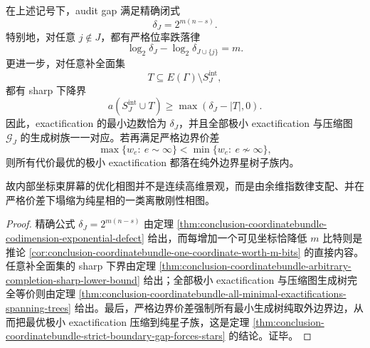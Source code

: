 \begin{theorem}[余维指数律与纯星极小相]\label{thm:conclusion-integrable-screen-codimension-exponential-purestar}
在上述记号下，audit gap 满足精确闭式
\[
\delta_J=2^{m(n-s)}.
\]
特别地，对任意 \(j\notin J\)，都有严格位率跌落律
\[
\log_2\delta_J-\log_2\delta_{J\cup\{j\}}=m.
\]
更进一步，对任意补全面集
\[
T\subseteq E(\Gamma)\setminus S_J^{\mathrm{int}},
\]
都有 sharp 下降界
\[
a(S_J^{\mathrm{int}}\cup T)\ge \max(\delta_J-|T|,0).
\]
因此，exactification 的最小边数恰为 \(\delta_J\)，并且全部极小 exactification 与压缩图 \(\mathcal G_J\) 的生成树族一一对应。若再满足严格边界价差
\[
\max\{w_e:\ e\sim \infty\}
<
\min\{w_e:\ e\not\sim \infty\},
\]
则所有代价最优的极小 exactification 都落在纯外边界星树子族内。

故内部坐标束屏幕的优化相图并不是连续高维景观，而是由余维指数律支配、并在严格价差下塌缩为纯星相的一类离散刚性相图。
\end{theorem}
\begin{proof}
精确公式 \(\delta_J=2^{m(n-s)}\) 由定理 \ref{thm:conclusion-coordinatebundle-codimension-exponential-defect} 给出，而每增加一个可见坐标恰降低 \(m\) 比特则是推论 \ref{cor:conclusion-coordinatebundle-one-coordinate-worth-m-bits} 的直接内容。任意补全面集的 sharp 下界由定理 \ref{thm:conclusion-coordinatebundle-arbitrary-completion-sharp-lower-bound} 给出；全部极小 exactification 与压缩图生成树完全等价则由定理 \ref{thm:conclusion-coordinatebundle-all-minimal-exactifications-spanning-trees} 给出。最后，严格边界价差强制所有最小生成树纯取外边界边，从而把最优极小 exactification 压缩到纯星子族，这是定理 \ref{thm:conclusion-coordinatebundle-strict-boundary-gap-forces-stars} 的结论。证毕。
\end{proof}

